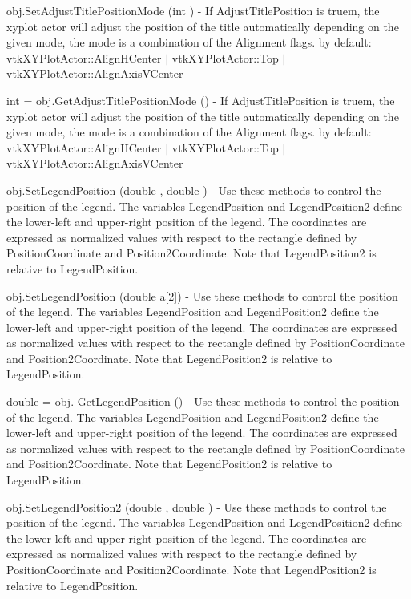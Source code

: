 \begin{DoxyItemize}
\item {\ttfamily obj.\-Set\-Adjust\-Title\-Position\-Mode (int )} -\/ If Adjust\-Title\-Position is truem, the xyplot actor will adjust the position of the title automatically depending on the given mode, the mode is a combination of the Alignment flags. by default\-: vtk\-X\-Y\-Plot\-Actor\-::\-Align\-H\-Center $|$ vtk\-X\-Y\-Plot\-Actor\-::\-Top $|$ vtk\-X\-Y\-Plot\-Actor\-::\-Align\-Axis\-V\-Center  
\item {\ttfamily int = obj.\-Get\-Adjust\-Title\-Position\-Mode ()} -\/ If Adjust\-Title\-Position is truem, the xyplot actor will adjust the position of the title automatically depending on the given mode, the mode is a combination of the Alignment flags. by default\-: vtk\-X\-Y\-Plot\-Actor\-::\-Align\-H\-Center $|$ vtk\-X\-Y\-Plot\-Actor\-::\-Top $|$ vtk\-X\-Y\-Plot\-Actor\-::\-Align\-Axis\-V\-Center  
\item {\ttfamily obj.\-Set\-Legend\-Position (double , double )} -\/ Use these methods to control the position of the legend. The variables Legend\-Position and Legend\-Position2 define the lower-\/left and upper-\/right position of the legend. The coordinates are expressed as normalized values with respect to the rectangle defined by Position\-Coordinate and Position2\-Coordinate. Note that Legend\-Position2 is relative to Legend\-Position.  
\item {\ttfamily obj.\-Set\-Legend\-Position (double a\mbox{[}2\mbox{]})} -\/ Use these methods to control the position of the legend. The variables Legend\-Position and Legend\-Position2 define the lower-\/left and upper-\/right position of the legend. The coordinates are expressed as normalized values with respect to the rectangle defined by Position\-Coordinate and Position2\-Coordinate. Note that Legend\-Position2 is relative to Legend\-Position.  
\item {\ttfamily double = obj. Get\-Legend\-Position ()} -\/ Use these methods to control the position of the legend. The variables Legend\-Position and Legend\-Position2 define the lower-\/left and upper-\/right position of the legend. The coordinates are expressed as normalized values with respect to the rectangle defined by Position\-Coordinate and Position2\-Coordinate. Note that Legend\-Position2 is relative to Legend\-Position.  
\item {\ttfamily obj.\-Set\-Legend\-Position2 (double , double )} -\/ Use these methods to control the position of the legend. The variables Legend\-Position and Legend\-Position2 define the lower-\/left and upper-\/right position of the legend. The coordinates are expressed as normalized values with respect to the rectangle defined by Position\-Coordinate and Position2\-Coordinate. Note that Legend\-Position2 is relative to Legend\-Position.  

\end{DoxyItemize}

